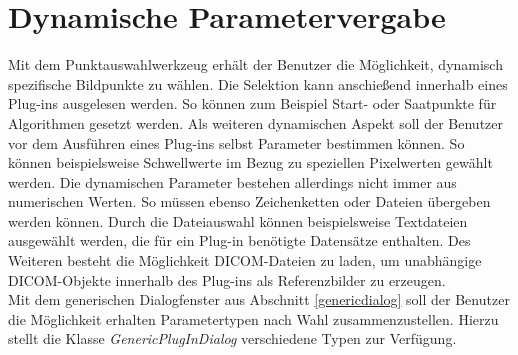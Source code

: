 \section{Dynamische Parametervergabe} \label{dynamicParameter}

Mit dem Punktauswahlwerkzeug erhält der Benutzer die Möglichkeit, dynamisch spezifische Bildpunkte zu wählen. Die Selektion kann anschießend innerhalb eines Plug-ins ausgelesen werden. So können zum Beispiel Start- oder Saatpunkte für Algorithmen gesetzt werden. Als weiteren dynamischen Aspekt soll der Benutzer vor dem Ausführen eines Plug-ins selbst Parameter bestimmen können. So können beispielsweise Schwellwerte im Bezug zu speziellen Pixelwerten gewählt werden. Die dynamischen Parameter bestehen allerdings nicht immer aus numerischen Werten. So müssen ebenso Zeichenketten oder Dateien übergeben werden können. Durch die Dateiauswahl können beispielsweise Textdateien ausgewählt werden, die für ein Plug-in benötigte Datensätze enthalten. Des Weiteren besteht die Möglichkeit DICOM-Dateien zu laden, um unabhängige DICOM-Objekte innerhalb des Plug-ins als Referenzbilder zu erzeugen.\\
Mit dem generischen Dialogfenster aus Abschnitt \ref{genericdialog} soll der Benutzer die Möglichkeit erhalten Parametertypen nach Wahl zusammenzustellen. Hierzu stellt die Klasse \textit{GenericPlugInDialog} verschiedene Typen zur Verfügung.

